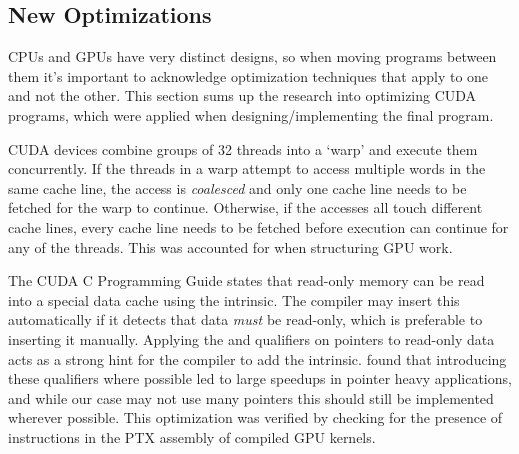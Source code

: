 \subsection{New Optimizations}
\label{sec:FutureOptimization}
CPUs and GPUs have very distinct designs, so when moving programs between them it's important to acknowledge optimization techniques that apply to one and not the other.
This section sums up the research into optimizing CUDA programs, which were applied when designing/implementing the final program.

CUDA devices combine groups of 32 threads into a `warp' and execute them concurrently\cite{tool:CUDAProgrammingV1}.
If the threads in a warp attempt to access multiple words in the same cache line, the access is \textit{coalesced}\cite{NVIDIAHowBlog} and only one cache line needs to be fetched for the warp to continue.
Otherwise, if the accesses all touch different cache lines, every cache line needs to be fetched before execution can continue for any of the threads.
This was accounted for when structuring GPU work.

The CUDA C Programming Guide\cite{NVIDIAGlobalGuide} states that read-only memory can be read into a special data cache using the  intrinsic.
The compiler may insert this automatically if it detects that data \emph{must} be read-only, which is preferable to inserting it manually.
Applying the  and  qualifiers on pointers to read-only data acts as a strong hint for the compiler to add the intrinsic.
\citeauthor{10.1145/3238147.3241533}\cite{10.1145/3238147.3241533} found that introducing these qualifiers where possible led to large speedups in pointer heavy applications, and while our case may not use many pointers this should still be implemented wherever possible.
This optimization was verified by checking for the presence of \cite{NvidiaPTX} instructions in the PTX assembly of compiled GPU kernels.

